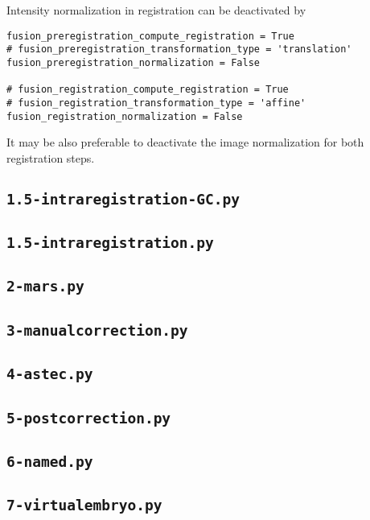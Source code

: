 Intensity normalization in registration can be deactivated by
\begin{verbatim}
fusion_preregistration_compute_registration = True
# fusion_preregistration_transformation_type = 'translation'
fusion_preregistration_normalization = False

# fusion_registration_compute_registration = True
# fusion_registration_transformation_type = 'affine'
fusion_registration_normalization = False
\end{verbatim}
It may be also preferable to  deactivate the image normalization for both registration steps.

%
%
%


\subsection{\texttt{1.5-intraregistration-GC.py}}

\subsection{\texttt{1.5-intraregistration.py}}

\subsection{\texttt{2-mars.py}}

\subsection{\texttt{3-manualcorrection.py}}

\subsection{\texttt{4-astec.py}}

\subsection{\texttt{5-postcorrection.py}}

\subsection{\texttt{6-named.py}}

\subsection{\texttt{7-virtualembryo.py}}





